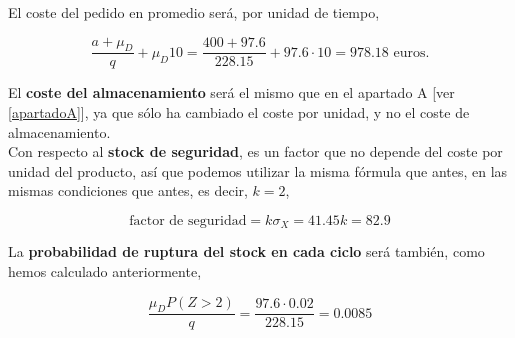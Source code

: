 \documentclass[a4paper,12pt]{article}
\begin{document}
El coste del pedido en promedio ser\'a, por unidad de tiempo,

$$ \dfrac{a + \mu_D}{q} + \mu_D 10 = \dfrac{400 + 97.6}{228.15} + 97.6\cdot 10 = 978.18 \text{ euros.} $$

\smallskip

El \textbf{coste del almacenamiento} ser\'a el mismo que en el apartado A [ver \ref{apartadoA}], ya que s\'olo ha cambiado el coste por unidad, y no el coste de almacenamiento. \\

Con respecto al \textbf{stock de seguridad}, es un factor que no depende del coste por unidad del producto, as\'i que podemos utilizar la misma f\'ormula que antes, en las mismas condiciones que antes, es decir, $k=2$,

$$ \text{factor de seguridad} = k\sigma_X = 41.45k = 82.9$$

\smallskip

La \textbf{probabilidad de ruptura del stock en cada ciclo} ser\'a tambi\'en, como hemos calculado anteriormente,

$$\dfrac{\mu_D P(Z > 2)}{q} = \dfrac{97.6\cdot 0.02}{228.15} = 0.0085$$ 
	
\end{document}
